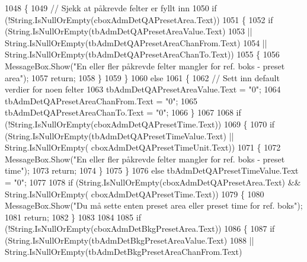 \begin{DoxyCode}
1048         \{
1049             \textcolor{comment}{// Sjekk at påkrevde felter er fyllt inn}
1050             \textcolor{keywordflow}{if} (!String.IsNullOrEmpty(cboxAdmDetQAPresetArea.Text))
1051             \{
1052                 \textcolor{keywordflow}{if} (String.IsNullOrEmpty(tbAdmDetQAPresetAreaValue.Text)
1053                     || String.IsNullOrEmpty(tbAdmDetQAPresetAreaChanFrom.Text)
1054                     || String.IsNullOrEmpty(tbAdmDetQAPresetAreaChanTo.Text))
1055                 \{
1056                     MessageBox.Show(\textcolor{stringliteral}{"En eller fler påkrevde felter mangler for ref. boks - preset area"});
1057                     \textcolor{keywordflow}{return};
1058                 \}
1059             \}
1060             \textcolor{keywordflow}{else}
1061             \{
1062                 \textcolor{comment}{// Sett inn default verdier for noen felter}
1063                 tbAdmDetQAPresetAreaValue.Text = \textcolor{stringliteral}{"0"};
1064                 tbAdmDetQAPresetAreaChanFrom.Text = \textcolor{stringliteral}{"0"};
1065                 tbAdmDetQAPresetAreaChanTo.Text = \textcolor{stringliteral}{"0"};
1066             \}
1067 
1068             \textcolor{keywordflow}{if} (!String.IsNullOrEmpty(cboxAdmDetQAPresetTime.Text))
1069             \{
1070                 \textcolor{keywordflow}{if} (String.IsNullOrEmpty(tbAdmDetQAPresetTimeValue.Text) || String.IsNullOrEmpty(
      cboxAdmDetQAPresetTimeUnit.Text))
1071                 \{
1072                     MessageBox.Show(\textcolor{stringliteral}{"En eller fler påkrevde felter mangler for ref. boks - preset time"});
1073                     \textcolor{keywordflow}{return};
1074                 \}
1075             \}
1076             \textcolor{keywordflow}{else} tbAdmDetQAPresetTimeValue.Text = \textcolor{stringliteral}{"0"};
1077 
1078             \textcolor{keywordflow}{if} (String.IsNullOrEmpty(cboxAdmDetQAPresetArea.Text) && String.IsNullOrEmpty(
      cboxAdmDetQAPresetTime.Text))
1079             \{
1080                 MessageBox.Show(\textcolor{stringliteral}{"Du må sette enten preset area eller preset time for ref. boks"});
1081                 \textcolor{keywordflow}{return};
1082             \}
1083 
1084 
1085             \textcolor{keywordflow}{if} (!String.IsNullOrEmpty(cboxAdmDetBkgPresetArea.Text))
1086             \{
1087                 \textcolor{keywordflow}{if} (String.IsNullOrEmpty(tbAdmDetBkgPresetAreaValue.Text)
1088                     || String.IsNullOrEmpty(tbAdmDetBkgPresetAreaChanFrom.Text)

\end{DoxyCode}
